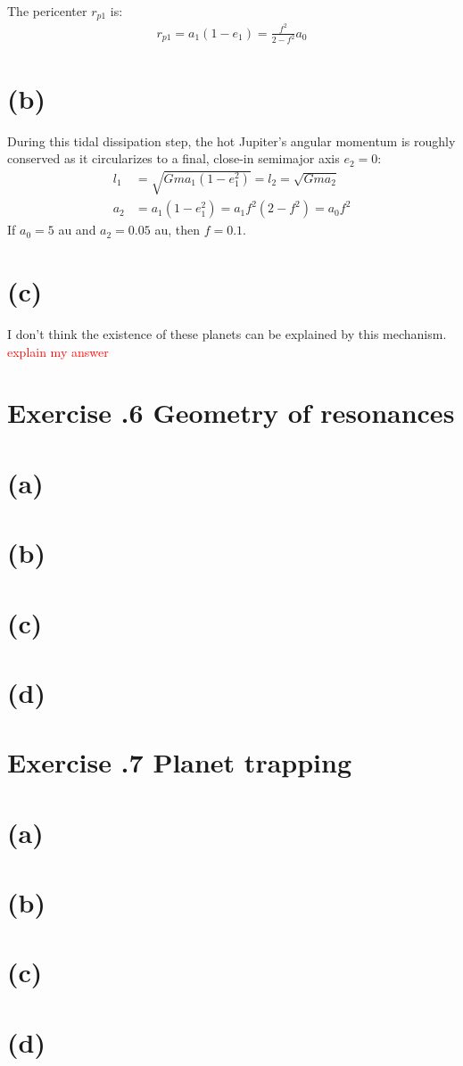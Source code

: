\documentclass[a4paper,12pt]{article}
\begin{document}
The pericenter $r_{p1}$ is:
\begin{align*}
    r_{p1} = a_1 (1 - e_1) = \frac{f^2}{2 - f^2} a_0
\end{align*}

\section*{(b)}
During this tidal dissipation step, the hot Jupiter's angular momentum is roughly conserved as it circularizes to a final, close-in
semimajor axis $e_2=0$:
\begin{align*}
    l_1 &= \sqrt{Gma_1(1-e_1^2)} = l_2 = \sqrt{Gma_2} \\
    a_2 &= a_1 (1-e_1^2) = a_1 f^2 (2 - f^2) = a_0 f^2
\end{align*}
If $a_0 = 5$ au and $a_2 = 0.05$ au, then $f = 0.1$.

\section*{(c)}
I don't think the existence of these planets can be explained by this mechanism.
\textcolor{red}{explain my answer}


\section*{\textbf{Exercise \uppercase\expandafter{}.6 Geometry of resonances}}
\section*{(a)}
\section*{(b)}
\section*{(c)}
\section*{(d)}

\section*{\textbf{Exercise \uppercase\expandafter{}.7 Planet trapping}}
\section*{(a)}
\section*{(b)}
\section*{(c)}
\section*{(d)}
\end{document}
